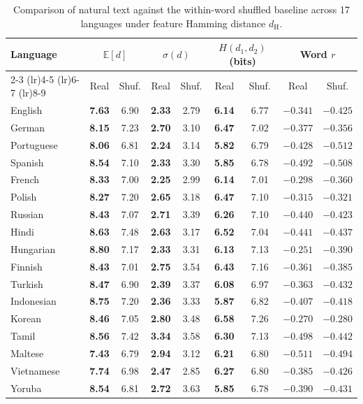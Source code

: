 \documentclass[cm]{glossa}
\begin{document}
\begin{table}[htbp]
\caption{Comparison of natural text against the within-word shuffled baseline across 17 languages under feature Hamming distance $d_{\text{H}}$.}
\centering\footnotesize
\begin{tabular}{lcccccccc}
\toprule
Language & \multicolumn{2}{c}{$\mathbb{E}[d]$} & \multicolumn{2}{c}{$\sigma(d)$} & \multicolumn{2}{c}{$H(d_1, d_2)$ (bits)} & \multicolumn{2}{c}{Word $r$} \\
\cmidrule(lr){2-3} \cmidrule(lr){4-5} \cmidrule(lr){6-7} \cmidrule(lr){8-9}
 & Real & Shuf. & Real & Shuf. & Real & Shuf. & Real & Shuf. \\
\midrule
English    & \textbf{7.63} & 6.90 & \textbf{2.33} & 2.79 & \textbf{6.14} & 6.77 & $-0.341$ & $-0.425$ \\
German     & \textbf{8.15} & 7.23 & \textbf{2.70} & 3.10 & \textbf{6.47} & 7.02 & $-0.377$ & $-0.356$ \\
Portuguese & \textbf{8.06} & 6.81 & \textbf{2.24} & 3.14 & \textbf{5.82} & 6.79 & $-0.428$ & $-0.512$ \\
Spanish    & \textbf{8.54} & 7.10 & \textbf{2.33} & 3.30 & \textbf{5.85} & 6.78 & $-0.492$ & $-0.508$ \\
French     & \textbf{8.33} & 7.00 & \textbf{2.25} & 2.99 & \textbf{6.14} & 7.01 & $-0.298$ & $-0.360$ \\
Polish     & \textbf{8.27} & 7.20 & \textbf{2.65} & 3.18 & \textbf{6.47} & 7.10 & $-0.315$ & $-0.321$ \\
Russian    & \textbf{8.43} & 7.07 & \textbf{2.71} & 3.39 & \textbf{6.26} & 7.10 & $-0.440$ & $-0.423$ \\
Hindi      & \textbf{8.63} & 7.48 & \textbf{2.63} & 3.17 & \textbf{6.52} & 7.04 & $-0.441$ & $-0.437$ \\
Hungarian  & \textbf{8.80} & 7.17 & \textbf{2.33} & 3.31 & \textbf{6.13} & 7.13 & $-0.251$ & $-0.390$ \\
Finnish    & \textbf{8.43} & 7.01 & \textbf{2.75} & 3.54 & \textbf{6.43} & 7.16 & $-0.361$ & $-0.385$ \\
Turkish    & \textbf{8.47} & 6.90 & \textbf{2.39} & 3.37 & \textbf{6.08} & 6.97 & $-0.363$ & $-0.432$ \\
Indonesian & \textbf{8.75} & 7.20 & \textbf{2.36} & 3.33 & \textbf{5.87} & 6.82 & $-0.407$ & $-0.418$ \\
Korean     & \textbf{8.46} & 7.05 & \textbf{2.80} & 3.48 & \textbf{6.58} & 7.26 & $-0.270$ & $-0.280$ \\
Tamil      & \textbf{8.56} & 7.42 & \textbf{3.34} & 3.58 & \textbf{6.30} & 7.13 & $-0.498$ & $-0.442$ \\
Maltese    & \textbf{7.43} & 6.79 & \textbf{2.94} & 3.12 & \textbf{6.21} & 6.80 & $-0.511$ & $-0.494$ \\
Vietnamese & \textbf{7.74} & 6.98 & \textbf{2.47} & 2.85 & \textbf{6.27} & 6.80 & $-0.385$ & $-0.426$ \\
Yoruba     & \textbf{8.54} & 6.81 & \textbf{2.72} & 3.63 & \textbf{5.85} & 6.78 & $-0.390$ & $-0.431$ \\
\bottomrule
\end{tabular}
\label{tab:comparison}
\end{table}
\end{document}
